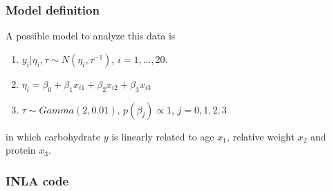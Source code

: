 \documentclass[a4paper,11pt]{report}
\begin{document}
\subsubsection*{Model definition}

A possible model to analyze this data is

\begin{enumerate}
\item $y_i|\eta_i, \tau \sim N(\eta_i, \tau^{-1})$, $i=1,...,20$. 
\item $\eta_i = \beta_0 + \beta_1 x_{i1} + \beta_2 x_{i2} + \beta_3 x_{i3}$
\item $\tau \sim Gamma(2, 0.01)$, $p(\beta_j) \propto 1$, $j=0,1,2,3$
\end{enumerate}
in which carbohydrate $y$ is linearly related to age $x_1$, relative weight $x_2$
and protein $x_3$. 


\subsubsection*{INLA code}


{\small}
\end{document}
